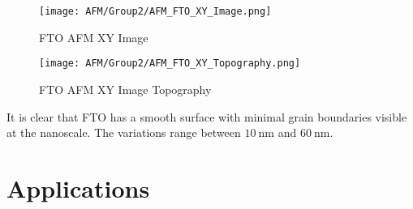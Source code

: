 \documentclass[11pt]{article}
\begin{document}
	\begin{figure}[!ht]
		\centering
		\begin{minipage}{0.45\textwidth}
			\centering
			\texttt{[image: AFM/Group2/AFM\_FTO\_XY\_Image.png]}
			\caption{FTO AFM XY Image}
			\label{fig:AFM_FTO_XY_Image}
		\end{minipage}
		\begin{minipage}{0.45\textwidth}
			\centering
			\texttt{[image: AFM/Group2/AFM\_FTO\_XY\_Topography.png]}
			\caption{FTO AFM XY Image Topography}
			\label{fig:AFM_FTO_XY_Topography}
		\end{minipage}
	\end{figure}
	
	It is clear that FTO has a smooth surface with minimal grain boundaries visible at the nanoscale. The variations range between $\qty{10}{\nano\meter}$ and $\qty{60}{\nano\meter}$.
	
	
\clearpage
	
	\section{Applications}
	
\end{document}

